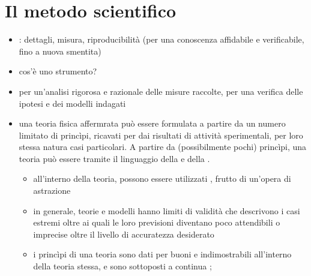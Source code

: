 \documentclass[letterpaper,10pt,italian]{jupyterBook}
\begin{document}
\chapter{Il metodo scientifico}
\label{\detokenize{ch/intro/scientific-method:il-metodo-scientifico}}\label{\detokenize{ch/intro/scientific-method:physics-hs-intro-scientific-method}}\label{\detokenize{ch/intro/scientific-method::doc}}\begin{itemize}
\item {} 
\sphinxAtStartPar
{}: dettagli, misura, riproducibilità (per una conoscenza affidabile e verificabile, fino a nuova smentita)

\item {} 
\sphinxAtStartPar
{} cos’è uno strumento?

\item {} 
\sphinxAtStartPar
{} per un’analisi rigorosa e razionale delle misure raccolte, per una verifica delle ipotesi e dei modelli indagati

\item {} 
\sphinxAtStartPar
{} una teoria fisica affermrata può essere formulata a partire da un numero limitato di princìpi, ricavati per  dai risultati di attività sperimentali, per loro stessa natura casi particolari. A partire da (possibilmente pochi) princìpi, una teoria può essere  tramite il linguaggio della  e della .
\begin{itemize}
\item {} 
\sphinxAtStartPar
all’interno della teoria, possono essere utilizzati , frutto di un’opera di astrazione

\item {} 
\sphinxAtStartPar
in generale, teorie e modelli hanno limiti di validità che descrivono i casi estremi oltre ai quali le loro previsioni diventano poco attendibili o imprecise oltre il livello di accuratezza desiderato

\item {} 
\sphinxAtStartPar
i princìpi di una teoria sono dati per buoni e indimostrabili all’interno della teoria stessa, e sono sottoposti a continua ; 

\end{itemize}

\end{itemize}
\end{document}
